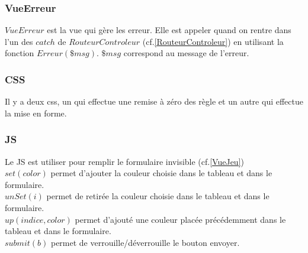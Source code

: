 \documentclass{article}
\begin{document}
        \subsubsection{VueErreur}
            $VueErreur$ est la vue qui gère les erreur. Elle est appeler quand on rentre dans l'un des $catch$ de $RouteurControleur$ (cf.\ref{RouteurControleur}) en utilisant la fonction $Erreur(\$msg)$. $\$msg$ correspond au message de l'erreur.
            
        \subsubsection{CSS}
            Il y a deux css, un qui effectue une remise à zéro des règle et un autre qui effectue la mise en forme.
            
        \subsubsection{JS}
            Le JS est utiliser pour remplir le formulaire invisible (cf.\ref{VueJeu})\\
            $set(color)$ permet d'ajouter la couleur choisie dans le tableau et dans le formulaire.\\
            $unSet(i)$ permet de retirée la couleur choisie dans le tableau et dans le formulaire.\\
            $up(indice, color)$ permet d'ajouté une couleur placée précédemment dans le tableau et dans le formulaire.\\
            $submit(b)$ permet de verrouille/déverrouille le bouton envoyer.
\end{document}
